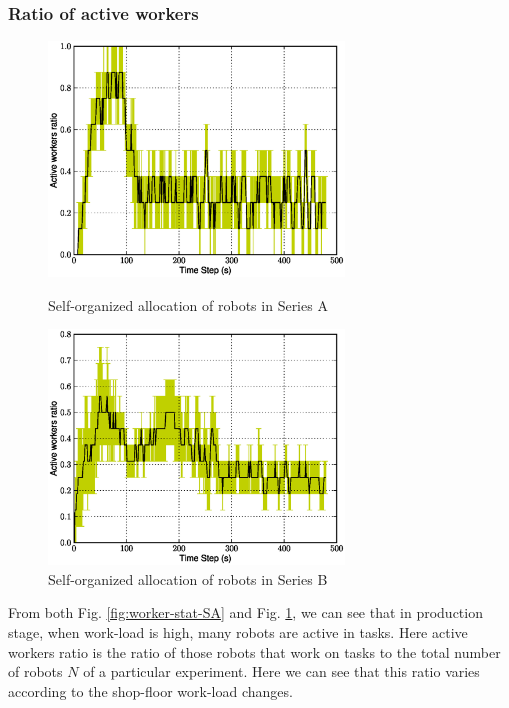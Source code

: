 \documentclass[smallcondensed]{svjour3}
\begin{document}
\subsubsection{Ratio of active workers}
\begin{figure}
\centering
\includegraphics[width=0.7\textwidth, angle=0]
{images/global-8robots/Plasticity-8robots2tasks.eps}
\caption{\small Self-organized allocation of robots in Series A}
\label{fig:worker-stat-SA}
%
\centering
\includegraphics[width=0.7\textwidth, angle=0]{images/WorkerRatio.eps}
\caption{\small Self-organized allocation of robots in Series B }
\label{fig:worker-stat-SB} %
\end{figure}
From both Fig. \ref{fig:worker-stat-SA} and Fig. \ref{fig:worker-stat-SB}, we can  see that in production stage, when work-load is high, many robots are active in tasks. Here active workers ratio is the ratio of those robots that work on tasks to the total number of robots $N$ of a particular experiment.   Here we can see that this ratio varies according to the shop-floor work-load changes.
\end{document}
